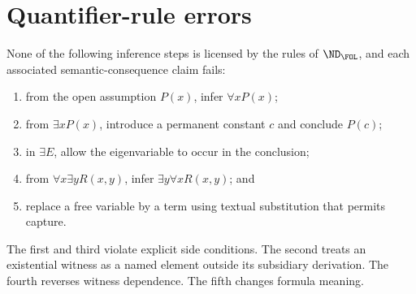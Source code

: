 \section{Quantifier-rule errors}
\label{sec:fol-deduction-04}

\begin{warning}
None of the following inference steps is licensed by the rules of
\(\ND_{\FOL}\), and each associated semantic-consequence claim fails:
\begin{enumerate}
  \item from the open assumption \(P(x)\), infer \(\forall xP(x)\);
  \item from \(\exists xP(x)\), introduce a permanent constant \(c\) and
        conclude \(P(c)\);
  \item in \(\exists E\), allow the eigenvariable to occur in the conclusion;
  \item from \(\forall x\exists yR(x,y)\), infer
        \(\exists y\forall xR(x,y)\); and
  \item replace a free variable by a term using textual substitution that
        permits capture.
\end{enumerate}
The first and third violate explicit side conditions.  The second treats an
existential witness as a named element outside its subsidiary derivation.  The
fourth reverses witness dependence.  The fifth changes formula meaning.
\end{warning}

